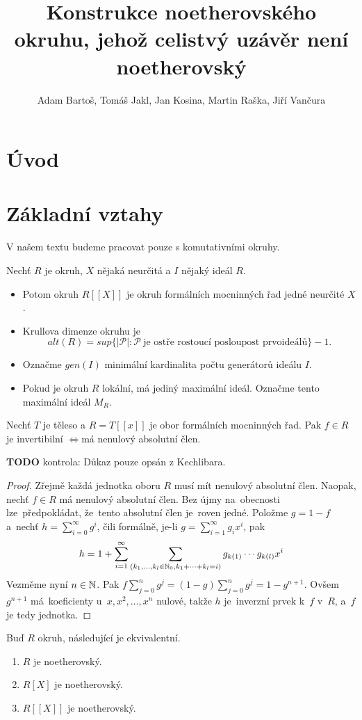\documentclass[11pt,a4paper]{article}
\title{Konstrukce noetherovského okruhu, jehož celistvý uzávěr není
	noetherovský}
\author{Adam Bartoš, Tomáš Jakl, Jan Kosina, Martin Raška, Jiří Vančura}
\newcommand\p[1]{\mathcal{ #1 }} %
\newcommand\IFF{\ensuremath{\iff}}
\theoremstyle{definition}
\theoremstyle{plain}
\begin{document}
\maketitle
\section{Úvod}

\section{Základní vztahy}
V našem textu budeme pracovat pouze s komutativními okruhy.

 Nechť $R$ je okruh, $X$ nějaká neurčitá a $I$ nějaký ideál $R$.
\begin{itemize}
	\item Potom okruh $R[[X]]$ je okruh formálních mocninných řad jedné
	neurčité $X$.
	\item Krullova dimenze okruhu je $$alt(R) = sup \{ |\p P| : \p P~\text{je
	ostře rostoucí posloupost prvoideálů} \} - 1.$$
	\item Označme $gen(I)$ minimální kardinalita počtu generátorů ideálu $I$.
	\item Pokud je okruh $R$ lokální, má jediný maximální ideál. Označme tento
	maximální ideál $M_R$.
\end{itemize}

\veta Nechť $T$ je těleso a $R = T[[x]]$ je obor formálních mocninných řad. Pak
$f \in R$ je invertibilní \IFF má nenulový absolutní člen.

\textbf{TODO} kontrola: Důkaz pouze opsán z Kechlibara.

\begin{proof}
	Zřejmě každá jednotka oboru $R$ musí mít nenulový absolutní člen. Naopak,
	nechť $f\in R$ má nenulový absolutní člen. Bez újmy na~obecnosti
	lze~před\-po\-klá\-dat, že~tento absolutní člen je~roven jedné. Položme $g=
	1-f$ a~nechť $h =  \sum_{i= 0}^\infty g^i$, čili formálně, je-li $g=
	\sum_{i= 1}^\infty g_ix^i$, pak $$h= 1+\sum_{i= 1}^\infty
	\sum_{(k_1,\dots,k_l\in \Bbb N_0, k_1+\dots+k_l= i)} g_{k(1)}\cdots
	g_{k(l)}x^i$$ Vezměme nyní $n\in \Bbb N$. Pak $f\sum_{j= 0}^n g^j =
	(1-g)\sum_{j= 0}^n g^j =  1 - g^{n+1}$. Ovšem $g^{n+1}$ má~koeficienty
	u~$x,x^2,\dots,x^n$ nulové, takže $h$ je~inverzní prvek k~$f$ v~$R$, a~$f$
	je tedy jednotka.
\end{proof}

 Buď $R$ okruh, následující je ekvivalentní.
\begin{enumerate}
	\item $R$ je noetherovský.
	\item $R[X]$ je noetherovský.
	\item $R[[X]]$ je noetherovský.
\end{enumerate}
\end{document}

